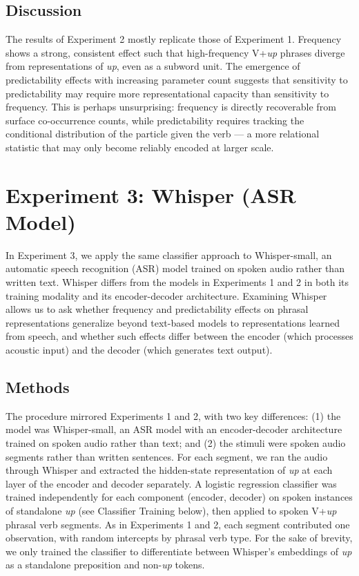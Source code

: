 \documentclass[11pt]{article}
\begin{document}
\subsection{Discussion}\label{discussion-1}

The results of Experiment 2 mostly replicate those of Experiment 1.
Frequency shows a strong, consistent effect such that high-frequency
V+\emph{up} phrases diverge from representations of \emph{up}, even as a
subword unit. The emergence of predictability effects with increasing
parameter count suggests that sensitivity to predictability may require
more representational capacity than sensitivity to frequency. This is
perhaps unsurprising: frequency is directly recoverable from surface
co-occurrence counts, while predictability requires tracking the
conditional distribution of the particle given the verb --- a more
relational statistic that may only become reliably encoded at larger
scale.

\section{Experiment 3: Whisper (ASR
Model)}\label{experiment-3-whisper-asr-model}

In Experiment 3, we apply the same classifier approach to Whisper-small,
an automatic speech recognition (ASR) model trained on spoken audio
rather than written text. Whisper differs from the models in Experiments
1 and 2 in both its training modality and its encoder-decoder
architecture. Examining Whisper allows us to ask whether frequency and
predictability effects on phrasal representations generalize beyond
text-based models to representations learned from speech, and whether
such effects differ between the encoder (which processes acoustic input)
and the decoder (which generates text output).

\subsection{Methods}\label{methods-2}

The procedure mirrored Experiments 1 and 2, with two key differences:
(1) the model was Whisper-small, an ASR model with an encoder-decoder
architecture trained on spoken audio rather than text; and (2) the
stimuli were spoken audio segments rather than written sentences. For
each segment, we ran the audio through Whisper and extracted the
hidden-state representation of \emph{up} at each layer of the encoder
and decoder separately. A logistic regression classifier was trained
independently for each component (encoder, decoder) on spoken instances
of standalone \emph{up} (see Classifier Training below), then applied to
spoken V+\emph{up} phrasal verb segments. As in Experiments 1 and 2,
each segment contributed one observation, with random intercepts by
phrasal verb type. For the sake of brevity, we only trained the
classifier to differentiate between Whisper's embeddings of \emph{up} as
a standalone preposition and non-\emph{up} tokens.
\end{document}
